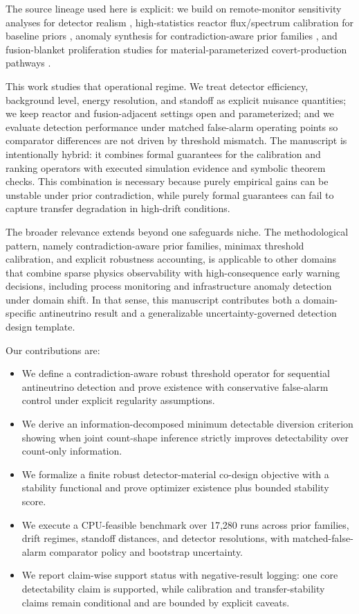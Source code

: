 \documentclass{article} %
\begin{document}
The source lineage used here is explicit: we build on remote-monitor sensitivity analyses for detector realism \citep{SRC009}, high-statistics reactor flux/spectrum calibration for baseline priors \citep{SRC002}, anomaly synthesis for contradiction-aware prior families \citep{SRC005}, and fusion-blanket proliferation studies for material-parameterized covert-production pathways \citep{SRC007}.

This work studies that operational regime. We treat detector efficiency, background level, energy resolution, and standoff as explicit nuisance quantities; we keep reactor and fusion-adjacent settings open and parameterized; and we evaluate detection performance under matched false-alarm operating points so comparator differences are not driven by threshold mismatch. The manuscript is intentionally hybrid: it combines formal guarantees for the calibration and ranking operators with executed simulation evidence and symbolic theorem checks. This combination is necessary because purely empirical gains can be unstable under prior contradiction, while purely formal guarantees can fail to capture transfer degradation in high-drift conditions.

The broader relevance extends beyond one safeguards niche. The methodological pattern, namely contradiction-aware prior families, minimax threshold calibration, and explicit robustness accounting, is applicable to other domains that combine sparse physics observability with high-consequence early warning decisions, including process monitoring and infrastructure anomaly detection under domain shift. In that sense, this manuscript contributes both a domain-specific antineutrino result and a generalizable uncertainty-governed detection design template.

Our contributions are:
\begin{itemize}
\item We define a contradiction-aware robust threshold operator for sequential antineutrino detection and prove existence with conservative false-alarm control under explicit regularity assumptions.
\item We derive an information-decomposed minimum detectable diversion criterion showing when joint count-shape inference strictly improves detectability over count-only information.
\item We formalize a finite robust detector-material co-design objective with a stability functional and prove optimizer existence plus bounded stability score.
\item We execute a CPU-feasible benchmark over 17,280 runs across prior families, drift regimes, standoff distances, and detector resolutions, with matched-false-alarm comparator policy and bootstrap uncertainty.
\item We report claim-wise support status with negative-result logging: one core detectability claim is supported, while calibration and transfer-stability claims remain conditional and are bounded by explicit caveats.
\end{itemize}
\end{document}
